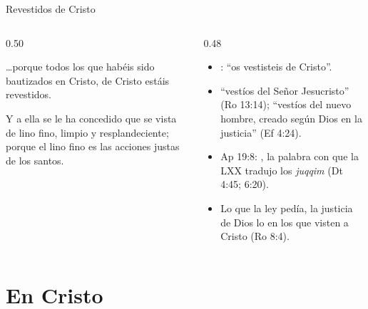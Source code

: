 \begin{frame}{Revestidos de Cristo}
\begin{columns}[c,onlytextwidth]
\begin{column}{0.50\textwidth}
\begin{cita}\ldots{}porque todos los que habéis sido bautizados en Cristo, de Cristo estáis revestidos.\end{cita}
\begin{cita}Y a ella se le ha concedido que se vista de lino fino, limpio y resplandeciente; porque el lino fino es las acciones justas de los santos.\end{cita}
\end{column}
\begin{column}{0.48\textwidth}\small
\begin{itemize}
\item {}: ``os vestisteis de Cristo''.
\item ``vestíos del Señor Jesucristo'' (Ro 13:14); ``vestíos del nuevo hombre, creado según Dios en la justicia'' (Ef 4:24).
\item Ap 19:8: , la palabra con que la LXX tradujo los \emph{juqqim} (Dt 4:45; 6:20).
\item Lo que la ley pedía, la justicia de Dios lo  en los que visten a Cristo (Ro 8:4).
\end{itemize}
\end{column}
\end{columns}
\end{frame}

\section{En Cristo}

